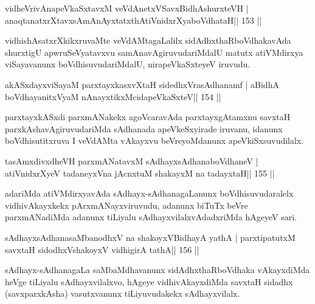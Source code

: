 
\begin{shl}
vidheVrivAnapeVkaSxtavxM veVdAnetxVSavxBidhAshurxteVH |
anaqtanatxrXtavxsAmAnAyxtatxthA\s tiVnidxrXyaboVdhataH\hfill || 153 ||
\end{shl}

\begin{artha}
vidhishAsatxrXkikxruvaMte veVdAMtagaLalilx sidAdhxthaRboVdhakavAda shurxtigU apwruSeVyatavxvu samAnavAgiruvudariMdalU matutx atiVMdirxya viSayavanunx boVdhisuvudariMdalU, nirapeVkaSxteyeV iruvudu.
\end{artha}

\begin{shl}
akASxdayxviSayaM parxtayxkasxvXtaH sidedhxVrasAdhanamf |
aBidhA boVdhayanitxVyaM nAnayxtikxMcidapeVkaSxteV\hfill || 154 ||
\end{shl}

\begin{artha}
parxtayxkASxdi parxmANakekx agoVcaravAda parxtayxgAtamxnu savxtaH parxkAshavAgiruvudariMda sAdhanada apeVkeSxyirade iruvanu, idanunx boVdhisutitxruva I veVdAMta vAkayxvu beVreyoMdanunx apeVkiSxsuvudilalx.
\end{artha}

\begin{shl}
tasAmxdivxdheVH parxmANatavxM sAdhayxsAdhanaboVdhaneV |
atiVnidxrXyeV tadaneyxVna jAcnxtuM shakayxM na tadayxtaH\hfill || 155 ||
\end{shl}

\begin{artha}
adariMda atiVMdirxyavAda sAdhayx-sAdhanagaLanunx boVdhisuvudaralelx vidhivAkayxkekx pArxmANayxviruvudu, adanunx biTuTx beVre parxmANadiMda adanunx tiLiyalu sAdhayxvilalxvAdadxriMda hAgeyeV sari.
\end{artha}

\begin{shl}
sAdhayxsAdhanasaMbanodhxV na shakoyxV\s BidhayA yathA |
parxtipatutxM savxtaH sidodhxV\s shakoyxV vidhigirA tathA\hfill || 156 ||
\end{shl}

\begin{artha}
sAdhayx-sAdhanagaLa saMbaMdhavanunx sidAdhxthaRboVdhaka vAkayxdiMda heVge tiLiyalu sAdhayxvilalxvo, hAgeye vidhivAkayxdiMda savxtaH sidadhx (savxparxkAsha) vasutxvanunx tiLiyuvudakekx sAdhayxvilalx.
\end{artha}


